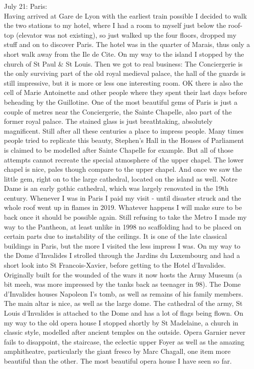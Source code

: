 July 21: Paris:\\
Having arrived at Gare de Lyon with the earliest train possible I decided to walk the two stations to my hotel, where I had a room to myself just below the roof-top (elevator was not existing), so just walked up the four floors, dropped my stuff and on to discover Paris. The hotel was in the quarter of Marais, thus only a short walk away from the Ile de Cite. On my way to the island I stopped by the church of St Paul \& St Louis. Then we got to real business: The Conciergerie is the only surviving part of the old royal medieval palace, the hall of the guards is still impressive, but it is more or less one interesting room. OK there is also the cell of Marie Antoinette and other people where they spent their last days before beheading by the Guillotine. One of the most beautiful gems of Paris is just a couple of metres near the Conciergerie, the Sainte Chapelle, also part of the former royal palace. The stained glass is just breathtaking, absolutely magnificent. Still after all these centuries a place to impress people. Many times people tried to replicate this beauty, Stephen's Hall in the Houses of Parliament is claimed to be modelled after Sainte Chapelle for example. But all of those attempts cannot recreate the special atmosphere of the upper chapel. The lower chapel is nice, pales though compare to the upper chapel. And once we saw the little gem, right on to the large cathedral, located on the island as well. Notre Dame is an early gothic cathedral, which was largely renovated in the 19th century. Whenever I was in Paris I paid my visit - until disaster struck and the whole roof went up in flames in 2019. Whatever happens I will make sure to be back once it should be possible again. Still refusing to take the Metro I made my way to the Pantheon, at least unlike in 1998 no scaffolding had to be placed on certain parts due to instability of the ceilings. It is one of the late classical buildings in Paris, but the more I visited the less impress I was. On my way to the Dome d'Invalides I strolled through the Jardins du Luxembourg and had a short look into St Francois-Xavier, before getting to the Hotel d'Invalides. Originally built for the wounded of the wars it now hosts the Army Museum (a bit meeh, was more impressed by the tanks back as teenager in 98). The Dome d'Invalides houses Napoleon I's tomb, as well as remains of his family members. The main altar is nice, as well as the large dome. The cathedral of the army, St Louis d'Invalides is attached to the Dome and has a lot of flags being flown. On my way to the old opera house I stopped shortly by St Madelaine, a church in classic style, modelled after ancient temples on the outside. Opera Garnier never fails to disappoint, the staircase, the eclectic upper Foyer as well as the amazing amphitheatre, particularly the giant fresco by Marc Chagall, one item more beautiful than the other. The most beautiful opera house I have seen so far.\\


